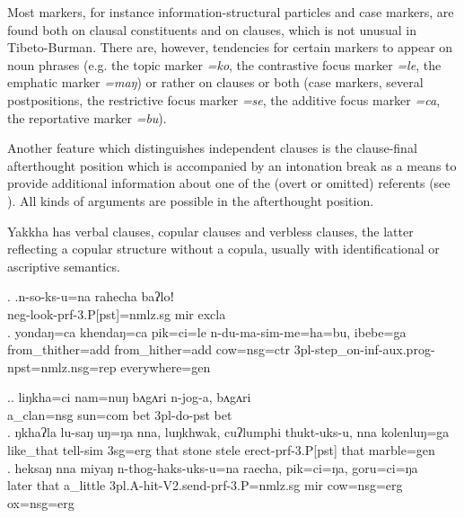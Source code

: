  Most markers, for instance information-structural particles and case markers, are found  both on clausal constituents and on clauses, which is not unusual in Tibeto-Burman. There are, however, tendencies for certain markers to appear on noun phrases (e.g. the topic marker \emph{=ko}, the contrastive focus marker \emph{=le}, the emphatic marker \emph{=maŋ}) or rather on clauses or both (case markers, several postpositions, the restrictive focus marker \emph{=se}, the additive focus marker \emph{=ca}, the reportative marker \emph{=bu}). 
 
 Another feature which distinguishes independent clauses is the clause-final afterthought position which is accompanied by an intonation break as a means to provide additional information about one of the (overt or omitted) referents (see \NNext). All kinds of arguments are possible in the afterthought position. 
 
 Yakkha has verbal clauses, copular clauses and verbless clauses, the latter  reflecting a copular structure without a copula, usually with identificational or ascriptive semantics.

 \ex. \ag.n-so-ks-u=na                           rahecha baʔloǃ\\
 {\sc neg-}look{\sc -prf-3.P[pst]=nmlz.sg} {\sc mir} {\sc excla}\\
  
  \bg. yondaŋ=ca           khendaŋ=ca         pik=ci=le        n-du-ma-sim-me=ha=bu,           ibebe=ga\\
 from\_thither{\sc =add} from\_hither{\sc =add} cow{\sc =nsg=ctr} {\sc 3pl-}step\_on{\sc -inf-aux.prog-npst=nmlz.nsg=rep} everywhere{\sc =gen}\\
   

 \ex.\ag. liŋkha=ci nam=nuŋ bʌgʌri n-jog-a,  bʌgʌri\\
 	a\_clan{\sc =nsg} sun{\sc =com}   bet    {\sc 3pl-}do{\sc -pst} bet\\
 	 
 \bg.  ŋkhaʔla   lu-saŋ        uŋ=ŋa   nna,  luŋkhwak, cuʔlumphi thukt-uks-u,           nna  kolenluŋ=ga\\
 like\_that tell{\sc -sim} {\sc 3sg=erg} that stone stele erect{\sc -prf-3.P[pst]} that marble{\sc =gen}\\
  
\bg. heksaŋ nna  miyaŋ n-thog-haks-uks-u=na     raecha, pik=ci=ŋa,      goru=ci=ŋa\\
later that a\_little {\sc 3pl.A-}hit{\sc -V2.send-prf-3.P=nmlz.sg} {\sc mir} cow{\sc =nsg=erg} ox{\sc =nsg=erg}\\
 

